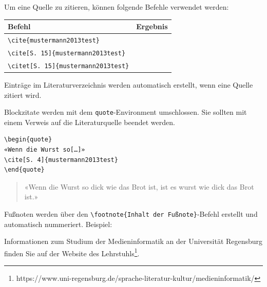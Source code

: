 Um eine Quelle zu zitieren, können folgende Befehle verwendet werden:

\bigskip

\begin{tabular}{@{}ll@{}}
\hline
\textbf{Befehl} & \textbf{Ergebnis} \\
\hline
    \verb|\cite{mustermann2013test}| & \cite{mustermann2013test} \\
    \verb|\cite[S. 15]{mustermann2013test}| & \cite[S. 15]{mustermann2013test} \\
    \verb|\citet[S. 15]{mustermann2013test}| & \citet[S. 15]{mustermann2013test} \\
\hline
\end{tabular}

\bigskip

Einträge im Literaturverzeichnis werden automatisch erstellt, wenn eine Quelle zitiert wird.


Blockzitate werden mit dem \verb|quote|-Environment umschlossen.
Sie sollten mit einem Verweis auf die Literaturquelle beendet werden.

\begin{verbatim}
\begin{quote}
«Wenn die Wurst so[…]»
\cite[S. 4]{mustermann2013test}
\end{quote}
\end{verbatim}

\begin{quote}
«Wenn die Wurst so dick wie das Brot ist, ist es wurst wie dick das Brot ist.»
\cite[S. 4]{mustermann2013test}
\end{quote}


Fußnoten werden über den \verb|\footnote{Inhalt der Fußnote}|-Befehl erstellt und automatisch nummeriert. Beispiel:

Informationen zum Studium der Medieninformatik an der Universität Regensburg finden Sie auf der Website des Lehrstuhls\footnote{https://www.uni-regensburg.de/sprache-literatur-kultur/medieninformatik/}.
